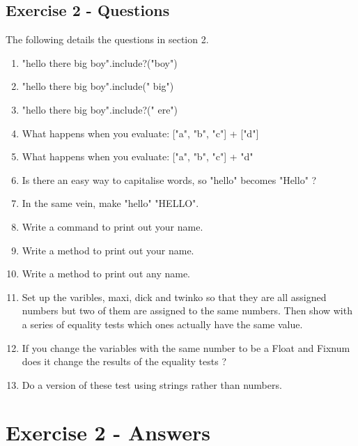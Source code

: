 \documentclass{scrreprt}
\begin{document}
	\section{Exercise 2 - Questions} \label{E2Q}
	The following details the questions in section 2.
	\begin{enumerate}
		\item "hello there big boy".include?("boy")
		\item "hello there big boy".include(" big")
		\item "hello there big boy".include?(" ere")
		\item What happens when you evaluate: ["a", "b", "c"] + ["d"]
		\item What happens when you evaluate: ["a", "b", "c"] + "d"
		\item Is there an easy way to capitalise words, so "hello" becomes "Hello" ?
		\item In the same vein, make "hello" "HELLO".
		\item Write a command to print out your name.
		\item Write a method to print out your name.
		\item Write a method to print out any name.
		\item Set up the varibles, maxi, dick and twinko so that they are all assigned numbers but two of them are assigned to the same numbers. Then show with a series of equality tests which ones actually have the same value.
		\item If you change the variables with the same number to be a Float and Fixnum does it change the results of the equality tests ?
		\item Do a version of these test using strings rather than numbers.
	\end{enumerate}
	
	\chapter{Exercise 2 -  Answers}\label{E2A}
	
\end{document}
